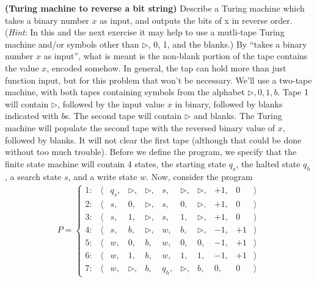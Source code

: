  \textbf{(Turing machine to reverse a bit string)}  Describe a Turing machine which takes a binary number $x$ as input, and outputs the bits of x in reverse order. (\textit{Hint}: In this and the next exercise it may help to use a mutli-tape Turing machine and/or symbols other than $\triangleright$, 0, 1, and the blanks.)
\Soln By ``takes a binary number $x$ as input'', what is meant is the non-blank portion of the tape contains the value $x$, encoded somehow.  In general, the tap can hold more than just function input, but for this problem that won't be necessary.  We'll use a two-tape machine, with both tapes containing symbols from the alphabet $\triangleright, 0, 1, b$.  Tape 1 will contain $\triangleright$, followed by the input value $x$ in binary, followed by blanks indicated with $b$s.  The second tape will contain $\triangleright$ and blanks.  The Turing machine will populate the second tape with the reversed binary value of $x$, followed by blanks.  It will not clear the first tape (although that could be done without too much trouble).  Before we define the program, we specify that the finite state machine will contain 4 states, the starting state $q_s$, the halted state $q_h$, a search state $s$, and a write state $w$.  Now, consider the program
\begin{align*}
P=\left\{
\begin{array}{ccccccccrrr}     1: &\langle&q_s,&\triangleright,&\triangleright,&s,&\triangleright,&\triangleright,&+1,&0&\rangle\\
       2: &\langle&s,& 0,&\triangleright,&s,&0,&\triangleright,&+1,&0&\rangle \\
       3: &\langle&s,& 1,& \triangleright,& s,& 1,& \triangleright,& +1,&0&\rangle \\
       4: &\langle&s,& b,& \triangleright,& w,& b,& \triangleright,& -1,& +1&\rangle \\
       5: &\langle&w,& 0,& b,& w,& 0,& 0,& -1,& +1&\rangle \\
       6: &\langle&w,& 1,& b,& w,& 1,& 1,& -1,& +1&\rangle \\ 
       7: &\langle&w,& \triangleright,& b,& q_h,& \triangleright,& b,& 0,& 0&\rangle
       \end{array}\right.
\end{align*}
